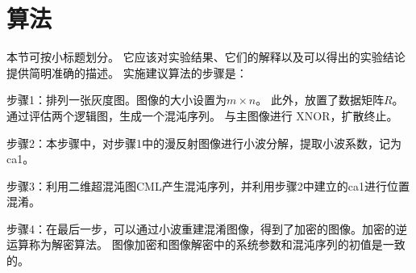 \chapter{算法}

本节可按小标题划分。
它应该对实验结果、它们的解释以及可以得出的实验结论提供简明准确的描述。
实施建议算法的步骤是：\\ \par

\noindent
{}
\setlength{\hangindent}{4em}
步骤1：排列一张灰度图。图像的大小设置为$m\times n$。 
此外，放置了数据矩阵$R$。 通过评估两个逻辑图，生成一个混沌序列。 与主图像进行 XNOR，扩散终止。

\noindent
{}
\setlength{\hangindent}{4em}
步骤2：本步骤中，对步骤1中的漫反射图像进行小波分解，提取小波系数，记为ca1。

\noindent
{}
\setlength{\hangindent}{4em}
步骤3：利用二维超混沌图CML产生混沌序列，并利用步骤2中建立的ca1进行位置混淆。

\noindent
{}
\setlength{\hangindent}{4em}
步骤4：在最后一步，可以通过小波重建混淆图像，得到了加密的图像。加密的逆运算称为解密算法。 图像加密和图像解密中的系统参数和混沌序列的初值是一致的。





